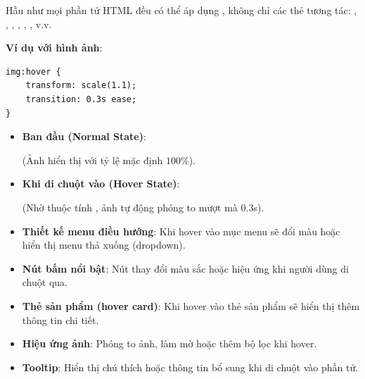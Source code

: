 \begin{conceptBox}
Hầu như mọi phần tử HTML đều có thể áp dụng , không chỉ các thẻ tương tác: , , , , , , v.v.

\textbf{Ví dụ với hình ảnh}:
\begin{codeWindow}
\begin{lstlisting}[language=CSS3]
img:hover {
    transform: scale(1.1);
    transition: 0.3s ease;
}
\end{lstlisting}
\end{codeWindow}

\begin{browserWindow}
\sffamily\small
\begin{itemize}[leftmargin=1.5em, itemsep=3pt, parsep=0pt]
    \item \textbf{Ban đầu (Normal State)}:
    \par\vspace{2pt}
    \quad (Ảnh hiển thị với tỷ lệ mặc định $100\%$).
    \par\vspace{4pt}
    \item \textbf{Khi di chuột vào (Hover State)}:
    \par\vspace{2pt}
    \quad (Nhờ thuộc tính , ảnh tự động phóng to mượt mà $0.3$s).
\end{itemize}
\end{browserWindow}
\end{conceptBox}

\begin{tipBox}
\begin{itemize}[leftmargin=1.5em, itemsep=2pt, parsep=0pt]
    \item \textbf{Thiết kế menu điều hướng}: Khi hover vào mục menu sẽ đổi màu hoặc hiển thị menu thả xuống (dropdown).
    \item \textbf{Nút bấm nổi bật}: Nút thay đổi màu sắc hoặc hiệu ứng khi người dùng di chuột qua.
    \item \textbf{Thẻ sản phẩm (hover card)}: Khi hover vào thẻ sản phẩm sẽ hiển thị thêm thông tin chi tiết.
    \item \textbf{Hiệu ứng ảnh}: Phóng to ảnh, làm mờ hoặc thêm bộ lọc khi hover.
    \item \textbf{Tooltip}: Hiển thị chú thích hoặc thông tin bổ sung khi di chuột vào phần tử.
\end{itemize}
\end{tipBox}


